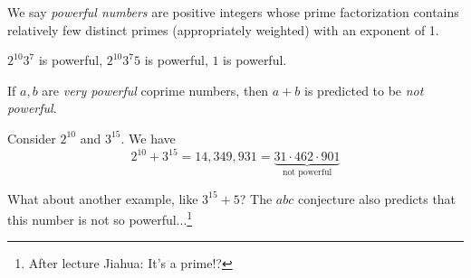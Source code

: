 \begin{conjecture}
    We say \emph{powerful numbers} are positive integers whose prime factorization contains relatively few distinct primes (appropriately weighted) with an exponent of 1. 
    \begin{example*}
        $2^{10}3^7$ is powerful, $2^{10}3^{7}5$ is powerful, $1$ is powerful. 
    \end{example*}

    If $a, b$ are \emph{very powerful} coprime numbers, then $a+b$ is predicted to be \emph{not powerful}. 
\end{conjecture}
\begin{example}
    Consider $2^{10}$ and $3^{15}$. We have 
    \[2^{10} + 3^{15} = 14,349,931 = \underbrace{31\cdot 462\cdot 901}_{\text{not powerful}}\]
\end{example}
What about another example, like $3^{15} + 5$? The $abc$ conjecture also predicts that this number is not so powerful...\footnote{After lecture Jiahua: It's a prime!?}